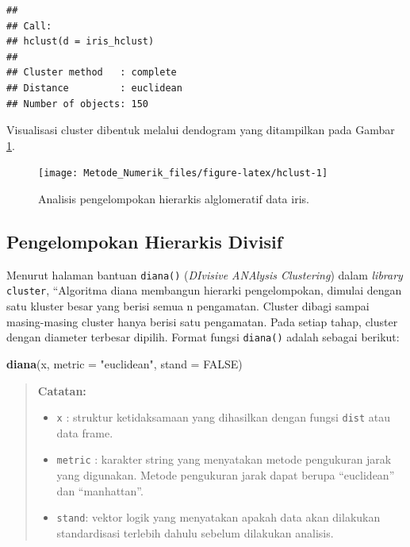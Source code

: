 \documentclass[
]{book}
\newenvironment{Shaded}{\begin{snugshade}}{\end{snugshade}}
\newcommand{\AttributeTok}[1]{\textcolor[rgb]{0.13,0.29,0.53}{#1}}
\newcommand{\ConstantTok}[1]{\textcolor[rgb]{0.56,0.35,0.01}{#1}}
\newcommand{\FunctionTok}[1]{\textcolor[rgb]{0.13,0.29,0.53}{\textbf{#1}}}
\newcommand{\NormalTok}[1]{#1}
\newcommand{\StringTok}[1]{\textcolor[rgb]{0.31,0.60,0.02}{#1}}
\providecommand{\tightlist}{%
  \setlength{\itemsep}{0pt}\setlength{\parskip}{0pt}}
\theoremstyle{definition}
\theoremstyle{definition}
\theoremstyle{definition}
\theoremstyle{definition}
\theoremstyle{remark}
\begin{document}
\begin{verbatim}
## 
## Call:
## hclust(d = iris_hclust)
## 
## Cluster method   : complete 
## Distance         : euclidean 
## Number of objects: 150
\end{verbatim}

Visualisasi cluster dibentuk melalui dendogram yang ditampilkan pada Gambar \ref{fig:hclust}.

\begin{figure}

{\centering \texttt{[image: Metode\_Numerik\_files/figure-latex/hclust-1]} 

}

\caption{Analisis pengelompokan hierarkis alglomeratif data iris.}\label{fig:hclust}
\end{figure}

\hypertarget{pengelompokan-hierarkis-divisif}{%
\subsection{Pengelompokan Hierarkis Divisif}\label{pengelompokan-hierarkis-divisif}}

Menurut halaman bantuan \texttt{diana()} (\emph{DIvisive ANAlysis Clustering}) dalam \emph{library} \texttt{cluster}, ``Algoritma diana membangun hierarki pengelompokan, dimulai dengan satu kluster besar yang berisi semua n pengamatan. Cluster dibagi sampai masing-masing cluster hanya berisi satu pengamatan. Pada setiap tahap, cluster dengan diameter terbesar dipilih. Format fungsi \texttt{diana()} adalah sebagai berikut:

\begin{Shaded}
\begin{Highlighting}[]
\FunctionTok{diana}\NormalTok{(x, }\AttributeTok{metric =} \StringTok{"euclidean"}\NormalTok{, }\AttributeTok{stand =} \ConstantTok{FALSE}\NormalTok{)}
\end{Highlighting}
\end{Shaded}

\begin{quote}
\textbf{Catatan:}

\begin{itemize}
\tightlist
\item
  \texttt{x} : struktur ketidaksamaan yang dihasilkan dengan fungsi \texttt{dist} atau data frame.
\item
  \texttt{metric} : karakter string yang menyatakan metode pengukuran jarak yang digunakan. Metode pengukuran jarak dapat berupa ``euclidean'' dan ``manhattan''.
\item
  \texttt{stand}: vektor logik yang menyatakan apakah data akan dilakukan standardisasi terlebih dahulu sebelum dilakukan analisis.
\end{itemize}
\end{quote}
\end{document}
